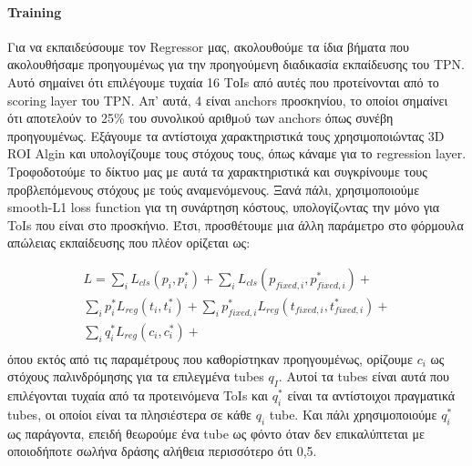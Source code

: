 \documentclass{report}
\begin{document}
\paragraph{ Training}
Για να εκπαιδεύσουμε τον Regressor μας, ακολουθούμε τα ίδια βήματα που ακολουθήσαμε προηγουμένως για την προηγούμενη διαδικασία εκπαίδευσης του TPN. Αυτό σημαίνει ότι 
επιλέγουμε τυχαία 16  ΤοΙs από αυτές που προτείνονται από το scoring layer  του TPN. Απ' αυτά, 4 είναι anchors προσκηνίου, το οποίοι σημαίνει ότι αποτελούν το 25\% του συνολικού
αριθμoύ των anchors όπως συνέβη προηγουμένως. Εξάγουμε τα αντίστοιχα χαρακτηριστικά τους χρησιμοποιώντας 3D ROI Algin και υπολογίζουμε τους στόχους τους, όπως
κάναμε για το regression layer. Τροφοδοτούμε το δίκτυο μας με αυτά τα χαρακτηριστικά και συγκρίνουμε τους προβλεπόμενους στόχους με τούς αναμενόμενους.
Ξανά πάλι, χρησιμοποιούμε smooth-L1 loss function για τη συνάρτηση κόστους, υπολογίζoντας την μόνο για ToIs που είναι στο προσκήνιο. Έτσι, προσθέτουμε μια άλλη παράμετρο στο
φόρμουλα απώλειας εκπαίδευσης που πλέον ορίζεται ως:

\begin{equation} 
\begin{split}
 L  =  \sum_iL_{cls}(p_i, p_i^*) + \sum_iL_{cls}(p_{fixed,i}, p_{fixed,i}^*) + \\
 \sum_ip_i^*L_{reg}(t_i,t_i^*) + \sum_ip_{fixed,i}^*L_{reg}(t_{fixed,i},t_{fixed,i}^*) + \\
  \sum_iq_i^*L_{reg}(c_{i}, c_{i}^*) + \\
\end{split}
\end{equation}
όπου εκτός από τις παραμέτρους που καθορίστηκαν προηγουμένως, ορίζουμε $c_{i} $ ως στόχους παλινδρόμησης για τα επιλεγμένα tubes $q _I $.
Αυτοί τα tubes είναι αυτά που επιλέγονται τυχαία από τα προτεινόμενα ToIs και  $q_i^*$ είναι τα αντίστοιχοι πραγματικά tubes, οι οποίοι είναι τα  πλησιέστερα σε κάθε $q_i$ tube.
Και πάλι χρησιμοποιούμε $q_i^*$ ως παράγοντα, επειδή θεωρούμε ένα tube ως φόντο όταν δεν επικαλύπτεται με οποιοδήποτε σωλήνα δράσης αλήθεια περισσότερο ότι 0,5.
\end{document}

